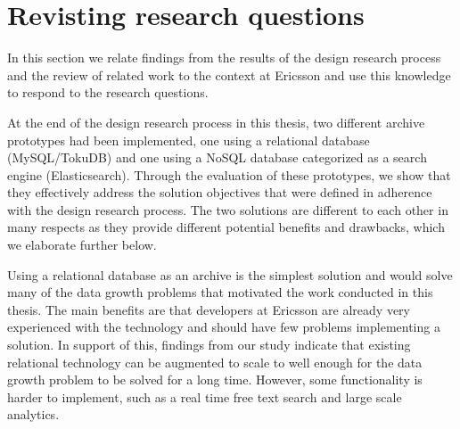 



\section{Revisting research questions}
In this section we relate findings from the results of the design research process and the review of related work to the context at Ericsson and use this knowledge to respond to the research questions.

At the end of the design research process in this thesis, two different archive prototypes had been implemented, one using a relational database (MySQL/TokuDB) and one using a NoSQL database categorized as a search engine (Elasticsearch). Through the evaluation of these prototypes, we show that they effectively address the solution objectives that were defined in adherence with the design research process. The two solutions are different to each other in many respects as they provide different potential benefits and drawbacks, which we elaborate further below.

Using a relational database as an archive is the simplest solution and would solve many of the data growth problems that motivated the work conducted in this thesis. The main benefits are that developers at Ericsson are already very experienced with the technology and should have few problems implementing a solution. In support of this, findings from our study indicate that existing relational technology can be augmented to scale to well enough for the data growth problem to be solved for a long time. However, some functionality is harder to implement, such as a real time free text search and large scale analytics.

